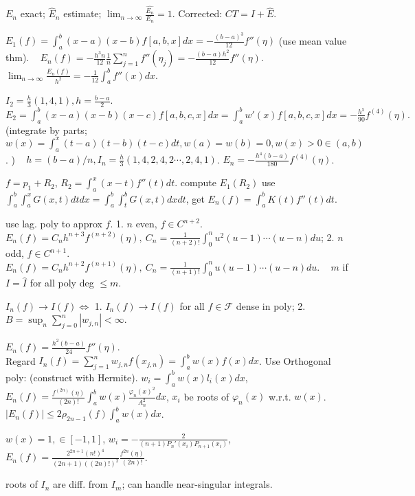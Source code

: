  $E_n $ exact; $\hat E_n $ estimate; $\lim_{n\to\infty}\frac{\hat{E_n}}{E_n} = 1 $. Corrected: $CT = I + \hat E$.

 $E_1(f) = \int_{a}^{b}(x-a)(x-b)f[a,b,x]dx = -\frac{(b-a)^3}{12}f''(\eta)$ (use mean value thm). ~ $E_n(f) = -\frac{h^3n}{12}\frac{1}{n}\sum_{j=1}^{n}f''(\eta_j) = -\frac{(b-a)h^2}{12}f''(\eta) $. ~ $\lim_{n\to\infty}\frac{E_n(f)}{h^2} = -\frac{1}{12}\int_{a}^{b}f''(x)dx $.

 $I_2 = \frac{h}{3}(1,4,1), h = \frac{b-a}{2}$. $E_2 = \int_{a}^{b}(x-a)(x-b)(x-c)f[a,b,c,x]dx = \int_{a}^{b}w'(x)f[a,b,c,x] dx = -\frac{h^5}{90}f^{(4)}(\eta). $ (integrate by parts; $w(x) = \int_{a}^{x}(t-a)(t-b)(t-c)dt, w(a)=w(b)=0, w(x)>0 \in (a, b) $. ) ~ $h = (b-a)/n, I_n = \frac{h}{3}(1,4,2,4,2\cdots, 2,4,1) $. $E_n = -\frac{h^4(b-a)}{180}f^{(4)}(\eta) $.

 $f = p_1+R_2 $, $R_2 = \int_{a}^{x}(x-t)f''(t)dt $. compute $E_1(R_2) $ use $\int_{a}^{b}\int_{a}^{x}G(x, t)dtdx = \int_a^b\int_t^bG(x, t)dxdt $, get $E_n(f) = \int_{a}^{b}K(t)f''(t)dt $.

 use lag. poly to approx $f$.  1. $n$ even, $f\in C^{n+2} $. $E_n(f) = C_nh^{n+3}f^{(n+2)}(\eta), ~C_n = \frac{1}{(n+2)!}\int_{0}^{n}u^2(u-1)\cdots (u-n)du $; 2. $n$ odd, $f\in C^{n+1} $. $E_n(f) = C_nh^{n+2}f^{(n+1)}(\eta), ~C_n = \frac{1}{(n+1)!}\int_0^n u(u-1)\cdots (u-n)du $. ~ $m$ if $I = \hat{I}$ for all poly deg $\le m$.

 $I_n(f)\to I(f) \iff $ 1. $I_n(f)\to I(f) $ for all $f\in\mathcal{F}$ dense in poly; 2. $B = \sup_{n}\sum_{j=0}^{n}|w_{j, n}| < \infty $.

 $E_n(f) = \frac{h^2(b-a)}{24}f''(\eta) $. \\[5pt]

 Regard $I_n(f) = \sum_{j=1}^{n}w_{j,n}f(x_{j,n}) = \int_{a}^{b}w(x)f(x)dx $. Use Orthogonal poly: (construct with Hermite). $w_i = \int_{a}^{b}w(x)l_i(x)dx $, $E_n(f) = \frac{f^{(2n)}(\eta)}{(2n)!}\int_{a}^{b}w(x)\frac{\varphi_n(x)^2}{A_n^2}dx $, $x_i $ be roots of $\varphi_n(x) $ w.r.t. $w(x)$. ~  $|E_n(f)|\le 2\rho_{2n-1}(f)\int_a^bw(x)dx $.

 $w(x) = 1, \in [-1, 1]$, $w_i = -\frac{2}{(n+1)P_n'(x_i)P_{n+1}(x_i)}$, $E_n(f) = \frac{2^{2n+1}(n!)^4}{(2n+1)((2n)!)^2}\frac{f^{2n}(\eta)}{(2n)!} $. 

 roots of $I_n $ are diff. from $I_m $; can handle near-singular integrals.

